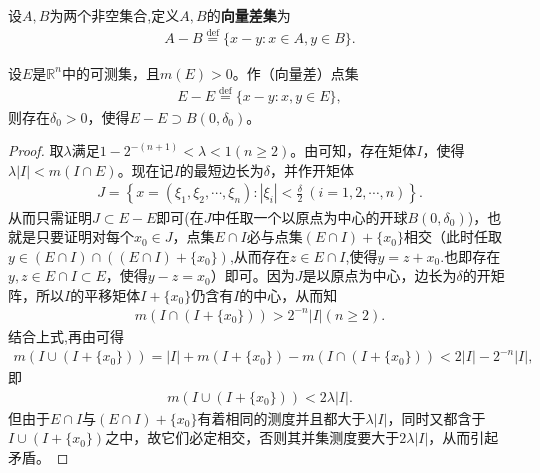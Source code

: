 \documentclass[../../main.tex]{subfiles}
\begin{document}
\begin{definition}[向量差集]\label{definition:向量差集}
设$A,B$为两个非空集合,定义$A,B$的\textbf{向量差集}为
\begin{align*}
A - B \stackrel{\text{def}}{=} \{x - y: x\in A,y \in B\}.
\end{align*}
\end{definition}

\begin{theorem}[Steinhaus定理]\label{theorem:Steinhaus定理}
设\(E\)是\(\mathbb{R}^n\)中的可测集，且\(m(E)>0\)。作（向量差）点集
\begin{align*}
E - E \stackrel{\text{def}}{=} \{x - y: x,y \in E\},
\end{align*}
则存在\(\delta_0>0\)，使得\(E - E \supset B(0,\delta_0)\)。
\end{theorem}
\begin{proof}
取\(\lambda\)满足\(1 - 2^{-(n + 1)}<\lambda<1\)$(n\geqslant  2)$。由可知，存在矩体\(I\)，使得\(\lambda|I|<m(I\cap E)\)。现在记\(I\)的最短边长为\(\delta\)，并作开矩体
\begin{align*}
J = \left\{x = (\xi_1,\xi_2,\cdots,\xi_n): |\xi_i|<\frac{\delta}{2}\ (i = 1,2,\cdots,n)\right\}.
\end{align*}
从而只需证明\(J\subset E - E\)即可(在$J$中任取一个以原点为中心的开球$B(0,\delta_0)$)，也就是只要证明对每个\(x_0\in J\)，点集\(E\cap I\)必与点集\((E\cap I)+\{x_0\}\)相交（此时任取$y\in (E\cap I)\cap((E\cap I)+\{x_0\})$,从而存在$z\in E\cap I$,使得$y=z+x_0$.也即存在\(y,z\in E\cap I\subset E\)，使得\(y - z = x_0\)）即可。因为\(J\)是以原点为中心，边长为\(\delta\)的开矩阵，所以\(I\)的平移矩体\(I+\{x_0\}\)仍含有\(I\)的中心，从而知
\begin{align*}
m(I\cap (I+\{x_0\}))>2^{-n}|I|(n\geqslant  2).
\end{align*}
结合上式,再由可得
\begin{align*}
m(I\cup (I+\{x_0\}))=|I|+m(I+\{x_0\})-m(I\cap (I+\{x_0\}))
<2|I|-2^{-n}|I|,
\end{align*}
即
\begin{align*}
m(I\cup (I+\{x_0\}))<2\lambda|I|.
\end{align*}
但由于\(E\cap I\)与\((E\cap I)+\{x_0\}\)有着相同的测度并且都大于\(\lambda|I|\)，同时又都含于\(I\cup (I+\{x_0\})\)之中，故它们必定相交，否则其并集测度要大于\(2\lambda|I|\)，从而引起矛盾。
\end{proof} 
\end{document}
